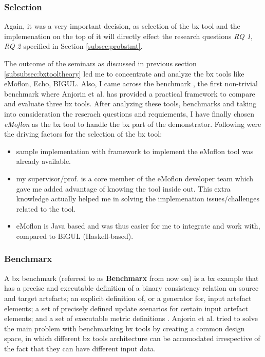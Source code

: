 \subsubsection{Selection}\label{subsubsec:bxtoolselection}
Again, it was a very important decision, as selection of the bx tool and the implemenation on the top of it will directly effect the research questions \textit{RQ 1}, \textit{RQ 2}  specified in Section \ref{subsec:probstmt}.

The outcome of the seminars as discussed in previous section \ref{subsubsec:bxtooltheory} led me to concentrate and analyze the bx tools like eMoflon, Echo, BIGUL. Also, I came across the benchmark \cite{benchmarx} \cite{benchmarx-reload}, the first non-trivial benchmark where Anjorin et al. has provided a practical framework to compare and evaluate three bx tools. After analyzing these tools, benchmarks and taking into consideration the reserach questions and requiements, I have finally chosen \textit{eMoflon} as the bx tool to handle the bx part of the demonstrator. Following were the driving factors for the selection of the bx tool:
\begin{itemize}
	\item {sample implementation with framework to implement the eMoflon tool was already available.}
	\item {my supervisor/prof. is a core member of the eMoflon developer team which gave me added advantage of knowing the tool inside out. This extra knowledge actually helped me in solving the implemenation issues/challenges related to the tool.}
	\item {eMoflon is Java based and was thus easier for me to integrate and work with, compared to BiGUL (Haskell-based).}
\end{itemize}

\subsubsection{Benchmarx}\label{subsubsec:benchmarx}
A bx benchmark (referred to as \textbf{Benchmarx} from now on) is a bx example that has a precise and executable definition of a binary consistency relation on source and target artefacts; an explicit definition of, or a generator for, input artefact elements; a set of precisely defined update scenarios for certain input artefact elements; and a set of executable metric definitions \cite{bx-theoryandappl}.
\newline\newline Anjorin et al. \cite{benchmarx-reload} tried to solve the main problem with benchmarking bx tools by creating a common design space, in which different bx tools architecture can be accomodated irrespective of the fact that they can have different input data. 

